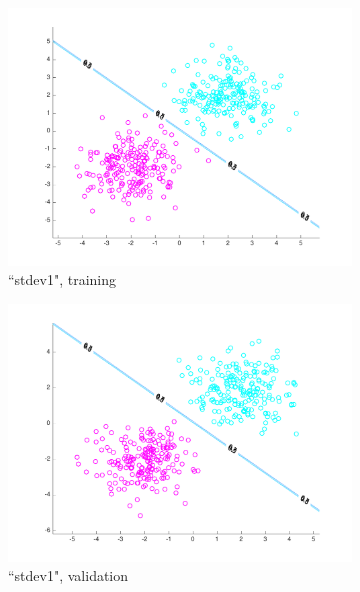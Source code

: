 \begin{figure}[h!]
\centering
    \begin{subfigure}[b]{0.22\textwidth}
	\includegraphics[scale=0.25]{hw2_1_stdev1_a_0.pdf}
	\caption{``stdev1", training}\label{fig:data_stdev1a}
    \end{subfigure}
    \quad
    \begin{subfigure}[b]{0.22\textwidth}
	\includegraphics[scale=0.25]{hw2_1_stdev1_b_0.pdf}
	\caption{``stdev1", validation}\label{fig:data_stdev1b}
    \end{subfigure}
    \begin{subfigure}[b]{0.22\textwidth}

\end{subfigure}
\end{figure}

